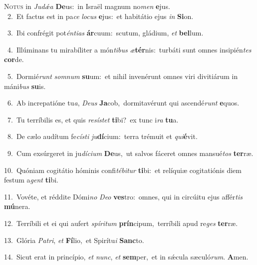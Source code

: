 \lettrine{\initial\textcolor{\initialcolor}{N}}{otus} in \textit{Ju}\-\textit{dǽ}\textit{a} \textbf{De}\-us:~\star in Israël magnum no\textit{men} \textbf{e}\-jus.\\
{\numbfont\textcolor{\numbcolor}{~2.}}~Et factus est in pa\textit{ce} \textit{lo}\-\textit{cus} \textbf{e}\-jus:~\star et habitátio ejus \textit{in} \textbf{Si}\-on.\par
{\numbfont\textcolor{\numbcolor}{~3.}}~Ibi confrégit pot\-\textit{én}\-\textit{ti}\textit{as} \textbf{ár}\-cuum:~\star scutum, gládium, \textit{et} \textbf{bel}\-lum.\par
{\numbfont\textcolor{\numbcolor}{~4.}}~Illúminans tu mirabíliter a món\-\textit{ti}\-\textit{bus} \textit{æ}\-\textbf{tér}nis:~\star turbáti sunt omnes insipién\textit{tes} \textbf{cor}\-de.\par
{\numbfont\textcolor{\numbcolor}{~5.}}~Dormié\textit{runt} \textit{som}\-\textit{num} \textbf{su}\-um:~\star et nihil invenérunt omnes viri divitiárum in máni\textit{bus} \textbf{su}\-is.\par
{\numbfont\textcolor{\numbcolor}{~6.}}~Ab increpatióne tu\-\textit{a}\-, \textit{De}\-\textit{us} \textbf{Ja}\-cob,~\star dormitavérunt qui ascendé\textit{runt} \textbf{e}\-quos.\par
{\numbfont\textcolor{\numbcolor}{~7.}}~Tu terríbilis es, et quis \textit{re}\-\textit{sís}\textit{tet} \textbf{ti}\-bi?~\star ex tunc i\textit{ra} \textbf{tu}\-a.\par
{\numbfont\textcolor{\numbcolor}{~8.}}~De cælo audítum fe\-\textit{cís}\-\textit{ti} \textit{ju}\-\textbf{dí}cium:~\star terra trémuit et \textit{qui}\-\textbf{é}vit.\par
{\numbfont\textcolor{\numbcolor}{~9.}}~Cum exsúrgeret in ju\-\textit{dí}\-\textit{ci}\textit{um} \textbf{De}\-us,~\star ut salvos fáceret omnes mansué\textit{tos} \textbf{ter}\-ræ.\par
{\numbfont\textcolor{\numbcolor}{10.}}~Quóniam cogitátio hóminis confi\-\textit{té}\-\textit{bi}\textit{tur} \textbf{ti}\-bi:~\star et relíquiæ cogitatiónis diem festum a\textit{gent} \textbf{ti}\-bi.\par
{\numbfont\textcolor{\numbcolor}{11.}}~Vovéte, et réddite Dómi\textit{no} \textit{De}\-\textit{o} \textbf{ves}\-tro:~\star omnes, qui in circúitu ejus affér\textit{tis} \textbf{mú}\-nera.\par
{\numbfont\textcolor{\numbcolor}{12.}}~Terríbili et ei qui aufert \textit{spí}\-\textit{ri}\textit{tum} \textbf{prín}\-cipum,~\star terríbili apud re\textit{ges} \textbf{ter}\-ræ.\par
{\numbfont\textcolor{\numbcolor}{13.}}~Glória \textit{Pa}\-\textit{tri}, \textit{et} \textbf{Fí}\-lio,~\star et Spirítu\textit{i} \textbf{Sanc}\-to.\par
{\numbfont\textcolor{\numbcolor}{14.}}~Sicut erat in princípio, \textit{et} \textit{nunc}\-, \textit{et} \textbf{sem}\-per,~\star et in sǽcula sæculó\-\textit{rum}\-. \textbf{A}\-men.\par

